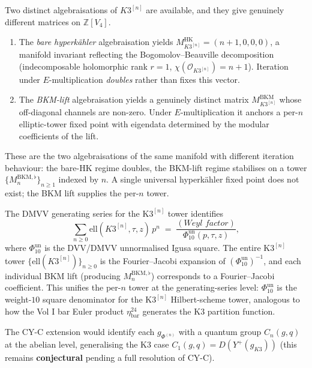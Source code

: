 \begin{remark}
\label{rem:hyperkahler-bkm-ghost-theorem}
Two distinct algebraisations of $K3^{[n]}$ are available, and they give
genuinely different matrices on $\mathbb{Z}[V_4]$.
\begin{enumerate}[label=\textup{(\alph*)}]
\item The \emph{bare hyperk\"ahler} algebraisation yields
 $M^{\mathrm{HK}}_{K3^{[n]}} = (n + 1, 0, 0, 0)$, a manifold
 invariant reflecting the Bogomolov--Beauville decomposition
 (indecomposable holomorphic rank $r = 1$,
 $\chi(\mathcal{O}_{K3^{[n]}}) = n + 1$). Iteration under
 $E$-multiplication \emph{doubles} rather than fixes this vector.
\item The \emph{BKM-lift} algebraisation yields a genuinely distinct
 matrix $M^{\mathrm{BKM}}_{K3^{[n]}}$ whose off-diagonal channels
 are non-zero. Under $E$-multiplication it anchors a per-$n$
 elliptic-tower fixed point with eigendata determined by the
 modular coefficients of the lift.
\end{enumerate}
These are the two algebraisations of the same manifold with different
iteration behaviour: the bare-HK regime doubles, the BKM-lift regime
stabilises on a tower $\{M^{\mathrm{BKM}, \flat}_n\}_{n \geq 1}$ indexed
by $n$. A single universal hyperk\"ahler fixed point does not exist;
the BKM lift supplies the per-$n$ tower.
\end{remark}

\begin{remark}
\label{rem:bkm-tower-phi10-connection}
The DMVV generating series for the K$3^{[n]}$ tower identifies
\[
 \sum_{n \geq 0} \mathrm{ell}(K3^{[n]}, \tau, z) \, p^n
 \;=\; \frac{(\textit{Weyl factor})}{\Phi_{10}^{\mathrm{un}}(p, \tau, z)},
\]
where \(\Phi_{10}^{\mathrm{un}}\) is the DVV/DMVV unnormalised Igusa square.
The entire K$3^{[n]}$ tower
$\{\mathrm{ell}(K3^{[n]})\}_{n \geq 0}$ is the Fourier--Jacobi expansion
of \((\Phi_{10}^{\mathrm{un}})^{-1}\), and each individual BKM lift
\textup{(}producing $M^{\mathrm{BKM}, \flat}_n$\textup{)} corresponds to
a Fourier--Jacobi coefficient. This unifies the per-$n$ tower at the
generating-series level: \(\Phi_{10}^{\mathrm{un}}\) is the
weight-$10$ square denominator for the K$3^{[n]}$ Hilbert-scheme tower,
analogous to how the Vol I bar Euler product
$\eta_{\mathrm{bar}}^{24}$ generates the K$3$ partition function.

The CY-C extension would identify each $g_{\Phi^{(n)}}$ with a quantum
group $C_n(g, q)$ at the abelian level, generalising the K$3$ case
$C_1(g, q) = D(Y^+(g_{K3}))$ \textup{(}this remains
\textbf{conjectural} pending a full resolution of CY-C\textup{).}
\end{remark}

